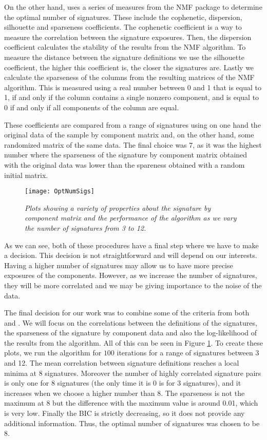 \documentclass[a4paper]{article}
\begin{document}
 On the other hand, \cite{Geoff} uses a series of measures from the NMF package to determine the optimal number of signatures. These include the cophenetic, dispersion, silhouette and sparseness coefficients. The cophenetic coefficient is a way to measure the correlation between the signature exposures. Then, the dispersion coefficient calculates the stability of the results from the NMF algorithm. To measure the distance between the signature definitions we use the silhouette coefficient, the higher this coefficient is, the closer the signatures are. Lastly we calculate the sparseness of the columns from the resulting matrices of the NMF algorithm. This is measured using a real number between 0 and 1 that is equal to 1, if and only if the column contains a single nonzero component, and is equal to 0 if and only if all components of the column are equal. 
 
 These coefficients are compared from a range of signatures using on one hand the original data of the sample by component matrix and, on the other hand, some randomized matrix of the same data. The final choice was 7, as it was the highest number where the sparseness of the signature by component matrix obtained with the original data was lower than the spareness obtained with a random initial matrix. 
 
 \begin{figure}[h] 
 	\centering
 	\texttt{[image: OptNumSigs]} 
 	\caption{\textit{Plots showing a variety of properties about the signature by component matrix and the performance of the algorithm as we vary the number of signatures from 3 to 12.}} \label{OptNumSigs}
 \end{figure}
 
 As we can see, both of these procedures have a final step where we have to make a decision. This decision is not straightforward and will depend on our interests. Having a higher number of signatures may allow us to have more precise exposures of the components. However, as we increase the number of signatures, they will be more correlated and we may be giving importance to the noise of the data. 
 
 The final decision for our work was to combine some of the criteria from both \cite{Geoff} and \cite{Shira}. We will focus on the correlations between the definitions of the signatures, the sparseness of the signature by component data and also the log-likelihood of the results from the algorithm. All of this can be seen in Figure \ref{OptNumSigs}. To create these plots, we run the algorithm for $100$ iterations for a range of signatures between 3 and 12. The mean correlation between signature definitions reaches a local minima at 8 signatures. Moreover the number of highly correlated signature pairs is only one for 8 signatures (the only time it is 0 is for 3 signatures), and it increases when we choose a higher number than 8. The sparseness is not the maximum at 8 but the difference with the maximum value is around 0.01, which is very low. Finally the BIC is strictly decreasing, so it does not provide any additional information. Thus, the optimal number of signatures was chosen to be 8. 
\end{document}
